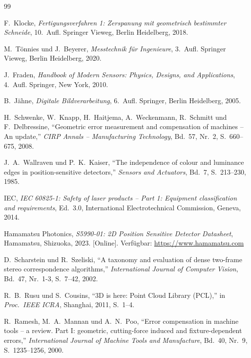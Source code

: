 ﻿\documentclass[a4paper,12pt]{article}
\theoremstyle{definition}
\begin{document}
\begin{thebibliography}{99}

F.~Klocke, \textit{Fertigungsverfahren 1: Zerspanung mit geometrisch bestimmter Schneide},
10.~Aufl. Springer Vieweg, Berlin Heidelberg, 2018.

M.~Tönnies und J.~Beyerer, \textit{Messtechnik für Ingenieure},
3.~Aufl. Springer Vieweg, Berlin Heidelberg, 2020.

J.~Fraden, \textit{Handbook of Modern Sensors: Physics, Designs, and Applications},
4.~Aufl. Springer, New York, 2010.

B.~Jähne, \textit{Digitale Bildverarbeitung},
6.~Aufl. Springer, Berlin Heidelberg, 2005.

H.~Schwenke, W.~Knapp, H.~Haitjema, A.~Weckenmann, R.~Schmitt und F.~Delbressine,
``Geometric error measurement and compensation of machines -- An update,''
\textit{CIRP Annals -- Manufacturing Technology}, Bd.~57, Nr.~2,
S.~660--675, 2008.

J.~A.~Wallraven und P.~K.~Kaiser, ``The independence of colour and luminance edges
in position-sensitive detectors,'' \textit{Sensors and Actuators}, Bd.~7, S.~213--230, 1985.

IEC, \textit{IEC 60825-1: Safety of laser products -- Part 1: Equipment classification and requirements},
Ed.~3.0, International Electrotechnical Commission, Geneva, 2014.

Hamamatsu Photonics, \textit{S5990-01: 2D Position Sensitive Detector Datasheet},
Hamamatsu, Shizuoka, 2023. [Online]. Verfügbar: \url{https://www.hamamatsu.com}

D.~Scharstein und R.~Szeliski, ``A taxonomy and evaluation of dense two-frame
stereo correspondence algorithms,'' \textit{International Journal of Computer Vision},
Bd.~47, Nr.~1-3, S.~7--42, 2002.

R.~B.~Rusu und S.~Cousins, ``3D is here: Point Cloud Library (PCL),''
in \textit{Proc.\ IEEE ICRA}, Shanghai, 2011, S.~1--4.

R.~Ramesh, M.~A.~Mannan und A.~N.~Poo, ``Error compensation in machine tools -- a review.
Part I: geometric, cutting-force induced and fixture-dependent errors,''
\textit{International Journal of Machine Tools and Manufacture},
Bd.~40, Nr.~9, S.~1235--1256, 2000.


\end{thebibliography}
\end{document}
